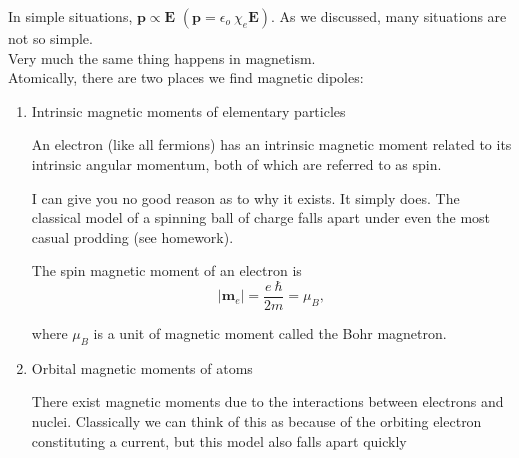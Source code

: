 \documentclass{article}
\numberwithin{equation}{section}
\begin{document}
In simple situations, $\bm{p} \propto \bm{E}$ $\left( \bm{p} = \epsilon_o\ \chi_e \bm{E} \right)$. As we discussed, many situations are not so simple. \\

Very much the same thing happens in magnetism. \\

Atomically, there are two places we find magnetic dipoles:

\begin{enumerate}

\item Intrinsic magnetic moments of elementary particles

An electron (like all fermions) has an intrinsic magnetic moment related to its intrinsic angular momentum, both of which are referred to as spin.

\begin{figure}[H]
\centering
{}
\label{fig:23:c}
\end{figure}

I can give you no good reason as to why it exists. It simply does. The classical model of a spinning ball of charge falls apart under even the most casual prodding (see homework).

The spin magnetic moment of an electron is
\begin{equation*}
    \left| \bm{m}_e \right| = \frac{e\ \hbar}{2m} = \mu_B,
\end{equation*}

where $\mu_B$ is a unit of magnetic moment called the Bohr magnetron.

\item Orbital magnetic moments of atoms

There exist magnetic moments due to the interactions between electrons and nuclei. Classically we can think of this as because of the orbiting electron constituting a current, but this model also falls apart quickly

\begin{figure}[H]
\centering
{}
\label{fig:23:c}
\end{figure}

\end{enumerate}
\end{document}
